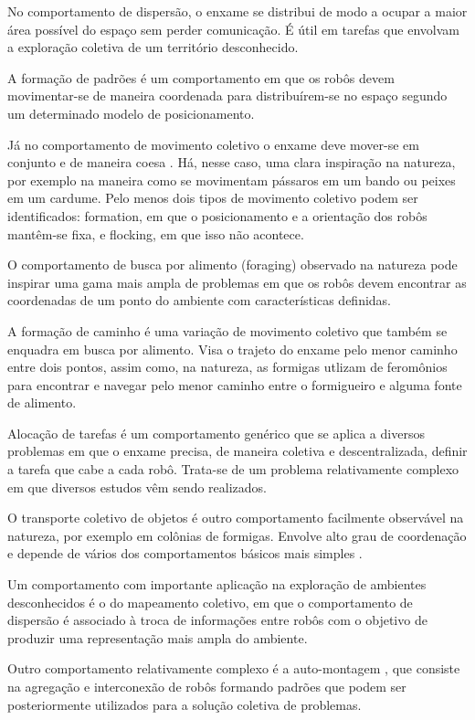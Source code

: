 No comportamento de dispersão, o enxame se distribui de modo a ocupar a maior área
possível do espaço sem perder comunicação. É útil em tarefas que envolvam a exploração
coletiva de um território desconhecido.

A formação de padrões é um comportamento em que os robôs devem movimentar-se de
maneira coordenada para distribuírem-se no espaço segundo um determinado modelo de
posicionamento.

Já no comportamento de movimento coletivo o enxame deve mover-se em conjunto e de maneira coesa \cite{sperati2008evolving}. Há, nesse caso, uma clara inspiração na natureza, por exemplo na maneira como se movimentam pássaros em um bando ou peixes em um cardume. Pelo menos dois tipos de movimento coletivo podem ser identificados: formation, em que o posicionamento e a orientação dos robôs mantêm-se fixa, e flocking, em que isso não acontece.

O comportamento de busca por alimento (foraging) observado na natureza pode inspirar uma gama mais ampla de problemas em que os robôs devem encontrar as coordenadas de um ponto do ambiente com características definidas.

A formação de caminho é uma variação de movimento coletivo que também se enquadra em busca por alimento. Visa o trajeto do enxame pelo menor caminho entre dois pontos, assim como, na natureza, as formigas utlizam de feromônios para encontrar e navegar pelo menor caminho entre o formigueiro e alguma fonte de alimento.

Alocação de tarefas é um comportamento genérico que se aplica a diversos problemas em que o enxame precisa, de maneira coletiva e descentralizada, definir a tarefa que cabe a cada robô. Trata-se de um problema relativamente complexo em que diversos estudos vêm sendo realizados.

O transporte coletivo de objetos é outro comportamento facilmente observável na natureza, por exemplo em colônias de formigas. Envolve alto grau de coordenação e depende de vários dos comportamentos básicos mais simples \cite{gross2006autonomous}.

Um comportamento com importante aplicação na exploração de ambientes desconhecidos é o do mapeamento coletivo, em que o comportamento de dispersão é associado à troca de informações entre robôs com o objetivo de produzir uma representação mais ampla do ambiente.

Outro comportamento relativamente complexo é a auto-montagem \cite{christensen2007mechanism}, que consiste na agregação e interconexão de robôs formando padrões que podem ser posteriormente utilizados para a solução coletiva de problemas.

